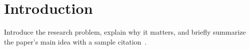 \section{Introduction}

Introduce the research problem, explain why it matters, and briefly summarize the paper's main idea with a sample citation~\cite{example2026}.


